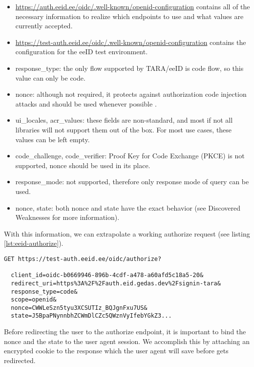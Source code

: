 \begin{itemize}
  \item \url{https://auth.eeid.ee/oidc/.well-known/openid-configuration} contains all of the necessary information to realize which endpoints to use and what values are currently accepted.
  \item \url{https://test-auth.eeid.ee/oidc/.well-known/openid-configuration} contains the configuration for the eeID test environment.
  \item {response\_type}: the only flow supported by TARA/eeID is code flow, so this value can only be code.
  \item {nonce}: although not required, it protects against authorization code injection attacks and should be used whenever possible \cite{ietf-oauth-security-topics-19}.
  \item {ui\_locales, acr\_values}: these fields are non-standard, and most if not all libraries will not support them out of the box. For most use cases, these values can be left empty.
  \item {code\_challenge, code\_verifier}: Proof Key for Code Exchange (PKCE) is not supported, {nonce} should be used in its place.
  \item {response\_mode}: not supported, therefore only response mode of {query} can be used.
  \item {nonce, state}: both nonce and state have the exact behavior (see Discovered Weaknesses for more information).
\end{itemize}

With this information, we can extrapolate a working {authorize} request (see listing \ref{lst:eeid-authorize}).

\begin{lstlisting}[caption={The eeID service authorize endpoint request}, label={lst:eeid-authorize}]
  GET https://test-auth.eeid.ee/oidc/authorize?

  client_id=oidc-b0669946-896b-4cdf-a478-a60afd5c18a5-20&
  redirect_uri=https%3A%2F%2Fauth.eid.gedas.dev%2Fsignin-tara&
  response_type=code&
  scope=openid&
  nonce=CWWLeSzn5tyu3XCSUTIz_BQJgnFxu7US&
  state=J5BpaPNynnbhZCWmDlCZc5QWznVyIfebYGkZ3...
\end{lstlisting}

Before redirecting the user to the {authorize} endpoint, it is important to bind the nonce and the state to the user agent session. We accomplish this by attaching an encrypted cookie to the response which the user agent will save before gets redirected.


